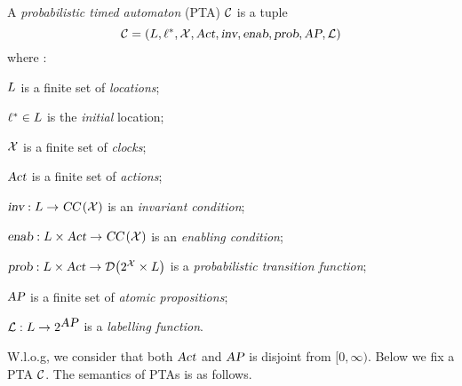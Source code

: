 \vspace{-0.6em}
\begin{definition}
A \emph{probabilistic timed automaton} (PTA) $\mathcal{C}$ is a tuple
\begin{equation}\label{eq:pta}
\mathcal{C}=\left(L, \ell^*, \mathcal{X}, \mbox{\sl Act}, \mbox{\sl inv}, \mbox{\sl enab},  \mbox{\sl prob}, \mbox{\sl AP}, \mathcal{L}\right)
\end{equation}
where :
\begin{compactitem}
\item $L$ is a finite set of \emph{locations};
\item $\ell^*\in L$ is the \emph{initial} location;
\item $\mathcal{X}$ is a finite set of \emph{clocks};
\item $\mbox{\sl Act}$ is a finite set of \emph{actions};
\item $\mbox{\sl inv}:L\rightarrow\mbox{\sl CC}\left(\mathcal{X}\right)$ is
an \emph{invariant condition};
\item $\mbox{\sl enab}:L\times\mbox{\sl Act}\rightarrow\mbox{\sl CC}\left(\mathcal{X}\right)$ is an \emph{enabling condition};
\item $\mbox{\sl prob}:L\times\mbox{\sl Act}\rightarrow{\mathcal{D}}{\left(2^{\mathcal{X}}\times L\right)}$ is a \emph{probabilistic transition function};
\item $\mbox{\sl AP}$ is a finite set of \emph{atomic propositions};
\item $\mathcal{L}:L\rightarrow 2^{\mbox{\sl AP}}$ is a \emph{labelling function}.
\end{compactitem}
\end{definition}
%
W.l.o.g, we consider that both $\mbox{\sl Act}$ and $\mbox{\sl AP}$ is disjoint from $[0,\infty)$. Below we fix a PTA $\mathcal{C}$.
The semantics of PTAs is as follows.


